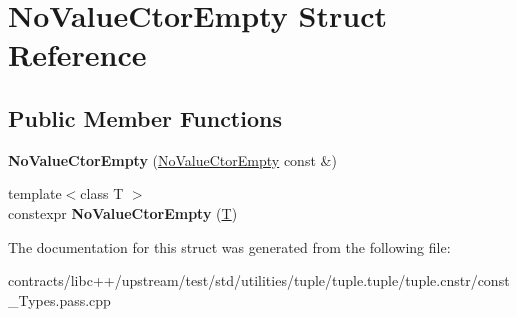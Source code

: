 \hypertarget{struct_no_value_ctor_empty}{}\section{No\+Value\+Ctor\+Empty Struct Reference}
\label{struct_no_value_ctor_empty}
\subsection*{Public Member Functions}
\begin{DoxyCompactItemize}
\item 
\mbox{\label{struct_no_value_ctor_empty_a06366b805ae9f5fbc2561ba425ec3c34}} 
{\bfseries No\+Value\+Ctor\+Empty} (\mbox{\hyperlink{struct_no_value_ctor_empty}{No\+Value\+Ctor\+Empty}} const \&)
\item 
\mbox{\label{struct_no_value_ctor_empty_a920f14d574c75685cdd6b18316afc241}} 
{\footnotesize template$<$class T $>$ }\\constexpr {\bfseries No\+Value\+Ctor\+Empty} (\mbox{\hyperlink{struct_t}{T}})
\end{DoxyCompactItemize}


The documentation for this struct was generated from the following file\+:\begin{DoxyCompactItemize}
\item 
contracts/libc++/upstream/test/std/utilities/tuple/tuple.\+tuple/tuple.\+cnstr/const\+\_\+\+Types.\+pass.\+cpp\end{DoxyCompactItemize}
